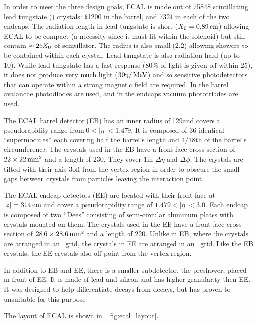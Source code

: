 In order to meet the three design goals, ECAL is made out of 75848
scintillating lead tungstate (\leadtungstate) crystals: 61200 in the barrel,
and 7324 in each of the two endcaps. The radiation length in lead tungstate is
short ($X_{0} = 0.89\text{\,cm}$) allowing ECAL to be compact (a
necessity since it must fit within the solenoid) but still contain $\approx
25X_{0}$ of scintillator. The \Moliere radius is also small
(2.2\centimeters) allowing showers to be contained within each crystal. Lead
tungstate is also radiation hard (up to 10\megarads). While lead tungstate has
a fast response (80\% of light is given off within 25\ns), it does not produce
very much light ($30 \gamma / \,\text{Me\hspace{-.08em}V}$) and so sensitive photodetectors that can
operate within a strong magnetic field are required. In the barrel avalanche
photodiodes are used, and in the endcaps vacuum phototriodes are used.

The ECAL barrel detector (EB) has an inner radius of 129\centimeters and covers
a pseudorapidity range from $0 < |\eta| < 1.479$. It is composed of 36
identical ``supermodules'' each covering half the barrel's length and 1/18th of
the barrel's circumference. The crystals used in the EB have a front face
cross-section of $22 \times 22\text{\,mm}^{2}$ and a length of
230\millimeters. They cover 1\degrees in $\Delta \eta$ and $\Delta \phi$. The
crystals are tilted with their axis 3\degrees off from the vertex region in
order to obscure the small gaps between crystals from particles leaving the
interaction point.

The ECAL endcap detectors (EE) are located with their front face at
$|z|=314\text{\,cm}$ and cover a pseudorapidity range of $1.479 < |\eta| <
3.0$. Each endcap is composed of two ``Dees'' consisting of semi-circular
aluminum plates with crystals mounted on them. The crystals used in the EE have
a front face cross-section of $28.6 \times 28.6\text{\,mm}^{2}$ and a length
of 220\millimeters. Unlike in EB, where the crystals are arranged in an
\coordetaphi~grid, the crystals in EE are arranged in an \coordxy~grid. Like
the EB crystals, the EE crystals also off-point from the vertex region.

In addition to EB and EE, there is a smaller subdetector, the preshower, placed
in front of EE. It is made of lead and silicon and has higher granularity then
EE. It was designed to help differentiate \pitogammagamma decays from
\higgstogammagamma decays, but has proven to unsuitable for this purpose.

The layout of ECAL is shown in \FIG~\ref{fig:ecal_layout}.

